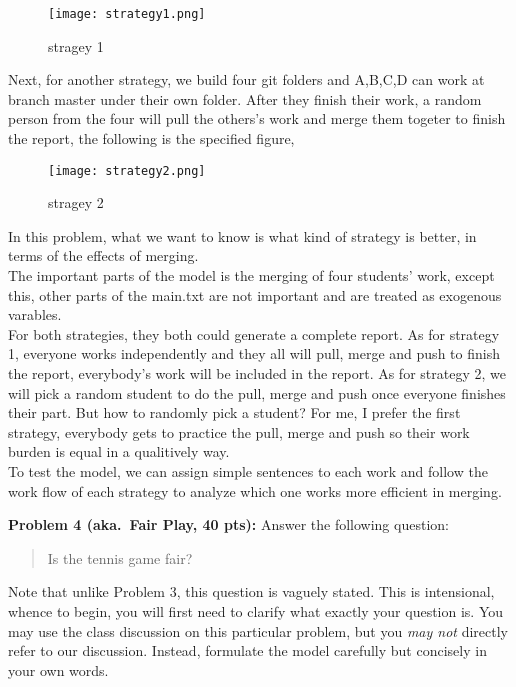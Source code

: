 \documentclass[12pt]{article}
\begin{document}
\begin{figure}[h]
    \begin{center}
        \texttt{[image: strategy1.png]}
    \end{center}
    \caption{stragey 1}
    \label{fig:branch}
\end{figure}
\newpage
\noindent Next, for another strategy, we build four git folders and A,B,C,D can work at branch master under their own folder. After they finish their work, a random person from the four will pull the others's work and merge them togeter to finish the report, the following is the specified figure,
\begin{figure}[h]
    \begin{center}
        \texttt{[image: strategy2.png]}
    \end{center}
    \caption{stragey 2}
    \label{fig:branch}
\end{figure}
\newpage
\noindent In this problem, what we want to know is what kind of strategy is better, in terms of the effects of merging. \\
The important parts of the model is the merging of four students' work, except this, other parts of the main.txt are not important and  are treated as exogenous varables. \\
For both strategies, they both could generate a complete report. As for strategy 1, everyone works independently and they all will pull, merge and push to finish the report, everybody's work will be included in the report. As for strategy 2, we will pick a random student to do the pull, merge and push once everyone finishes their part. But how to randomly pick a student? For me, I prefer the first strategy, everybody gets to practice the pull, merge and push so their work burden is equal in a qualitively way.\\
To test the model, we can assign simple sentences to each work and follow the work flow of each strategy to analyze which one works more efficient in merging. 



\vskip0.25in
\noindent\textbf{Problem 4 (aka.\ Fair Play, 40 pts):}
Answer the following question:
\begin{verse}
Is the tennis game fair?
\end{verse}
Note that unlike Problem 3, this question is vaguely stated.
This is intensional, whence to begin, you will first need to clarify
what exactly your question is.
You may use the class discussion on this particular 
problem, but you \emph{may not} directly refer to our 
discussion.  Instead, formulate the model carefully but concisely in 
your own words.   
\end{document}

